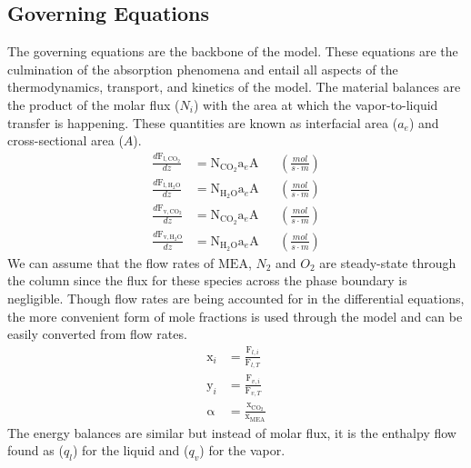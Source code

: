\documentclass[12pt, letterpaper]{article}
\begin{document}
        \subsection{Governing Equations}\label{subsec:governing-equations}
            The governing equations are the backbone of the model.
            These equations are the culmination of the absorption phenomena and entail all aspects of the thermodynamics, transport, and kinetics of the model.
            The material balances are the product of the molar flux ($N_i$) with the area at which the vapor-to-liquid transfer is happening.
            These quantities are known as interfacial area ($a_e$) and cross-sectional area ($A$).
            \begin{align}
                \frac{d \mathrm{F_{l, \mathrm{CO}_2}}}{d z} &= \mathrm{N_{\mathrm{CO}_2}} \mathrm{a}_e \mathrm{A} && \left(\frac{\unit{mol}}{\unit{s\cdot m}} \right)\\
                \frac{d \mathrm{F_{l, \mathrm{H_{2}O}}}}{d z} &=\mathrm{N_{\mathrm{H_{2}O}}} \mathrm{a}_e \mathrm{A} && \left(\frac{\unit{mol}}{\unit{s\cdot m}} \right)\\
                \frac{d \mathrm{F_{v, \mathrm{CO}_2}}}{d z} &=\mathrm{N_{\mathrm{CO}_2}} \mathrm{a}_e \mathrm{A} && \left(\frac{\unit{mol}}{\unit{s\cdot m}} \right)\\
                \frac{d \mathrm{F_{v, \mathrm{H_{2}O}}}}{d z} &=\mathrm{N_{\mathrm{H_{2}O}}} \mathrm{a}_e \mathrm{A} && \left(\frac{\unit{mol}}{\unit{s\cdot m}} \right)
            \end{align}
            We can assume that the flow rates of $\mathrm{MEA}$, $N_2$ and $O_2$ are steady-state through the column since the flux for these species across the phase boundary is negligible.
            Though flow rates are being accounted for in the differential equations, the more convenient form of mole fractions is used through the model and can be easily converted from flow rates.
            \begin{align}
                \mathrm{x}_i &= \frac{\mathrm{F}_{l, i}}{\mathrm{F}_{l, T}} \\
                \mathrm{y}_i &= \frac{\mathrm{F}_{v, i}}{\mathrm{F}_{v, T}} \\
                \mathrm{\alpha} &= \frac{\mathrm{x}_{\mathrm{CO}_2}}{\mathrm{x}_{\mathrm{MEA}}}
            \end{align}
            The energy balances are similar but instead of molar flux, it is the enthalpy flow found as ($q_l$) for the liquid and ($q_v$) for the vapor.
\end{document}
